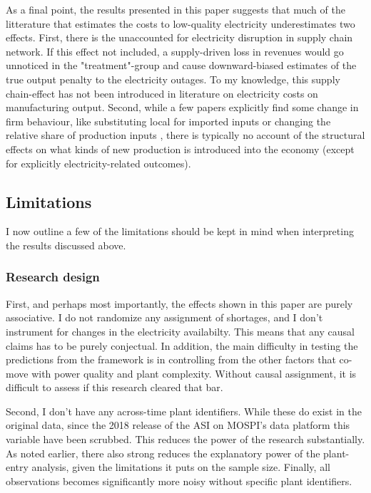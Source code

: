 \documentclass[11pt]{article}
\begin{document}
As a final point, the results presented in this paper suggests that much of the litterature that estimates the costs to low-quality electricity underestimates two effects. First, there is the unaccounted for electricity disruption in supply chain network. If this effect not included, a supply-driven loss in revenues would go unnoticed in the "treatment"-group and cause downward-biased estimates of the true output penalty to the electricity outages. To my knowledge, this supply chain-effect has not been introduced in literature on electricity costs on manufacturing output. Second, while a few papers explicitly find some change in firm behaviour, like substituting local for imported inputs \cite{fisher-vanden_electricity_2015} or changing the relative share of production inputs \citep{abeberese_electricity_2017}, there is typically no account of the structural effects on what kinds of new production is introduced into the economy (except for explicitly electricity-related outcomes).

\subsection{Limitations}
\label{sec:org979560b}
I now outline a few of the limitations should be kept in mind when interpreting the results discussed above.

\subsubsection{Research design}
First, and perhaps most importantly, the effects shown in this paper are purely associative. I do not randomize any assignment of shortages, and I don't instrument for changes in the electricity availabilty. This means that any causal claims has to be purely conjectual. In addition, the main difficulty in testing the predictions from the framework is in controlling from the other factors that co-move with power quality and plant complexity. Without causal assignment, it is difficult to assess if this research cleared that bar.

Second, I don't have any across-time plant identifiers. While these do exist in the original data, since the 2018 release of the ASI on MOSPI's data platform this variable have been scrubbed. This reduces the power of the research substantially. As noted earlier, there also strong reduces the explanatory power of the plant-entry analysis, given the limitations it puts on the sample size. Finally, all observations becomes significantly more noisy without specific plant identifiers. 
\end{document}
